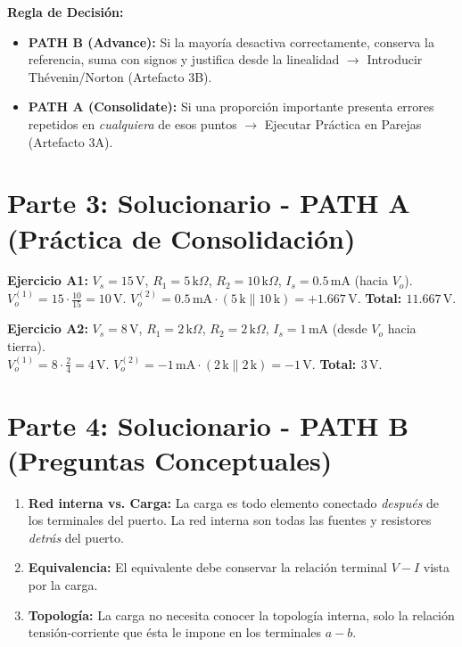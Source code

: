 \documentclass[11pt, a4paper]{article}
\begin{document}
\begin{tcolorbox}[colback=white, colframe=black, boxrule=0.5pt, arc=1mm]
\textbf{Regla de Decisión:}
\begin{itemize}
    \item \textbf{PATH B (Advance):} Si la mayoría desactiva correctamente, conserva la referencia, suma con signos y justifica desde la linealidad $\rightarrow$ Introducir Thévenin/Norton (Artefacto 3B).
    \item \textbf{PATH A (Consolidate):} Si una proporción importante presenta errores repetidos en \textit{cualquiera} de esos puntos $\rightarrow$ Ejecutar Práctica en Parejas (Artefacto 3A).
\end{itemize}
\end{tcolorbox}

\section*{Parte 3: Solucionario - PATH A (Práctica de Consolidación)}
\textbf{Ejercicio A1:} $V_s = 15\,\text{V}$, $R_1 = 5\,\text{k}\Omega$, $R_2 = 10\,\text{k}\Omega$, $I_s = 0.5\,\text{mA}$ (hacia $V_o$). \\
$V_o^{(1)} = 15 \cdot \frac{10}{15} = 10\,\text{V}$. \quad $V_o^{(2)} = 0.5\,\text{mA} \cdot (5\,\text{k} \parallel 10\,\text{k}) = +1.667\,\text{V}$. \quad \textbf{Total: $11.667\,\text{V}$}.

\vspace{0.2cm}
\noindent\textbf{Ejercicio A2:} $V_s = 8\,\text{V}$, $R_1 = 2\,\text{k}\Omega$, $R_2 = 2\,\text{k}\Omega$, $I_s = 1\,\text{mA}$ (desde $V_o$ hacia tierra). \\
$V_o^{(1)} = 8 \cdot \frac{2}{4} = 4\,\text{V}$. \quad $V_o^{(2)} = -1\,\text{mA} \cdot (2\,\text{k} \parallel 2\,\text{k}) = -1\,\text{V}$. \quad \textbf{Total: $3\,\text{V}$}.

\section*{Parte 4: Solucionario - PATH B (Preguntas Conceptuales)}
\begin{enumerate}
    \item \textbf{Red interna vs. Carga:} La carga es todo elemento conectado \textit{después} de los terminales del puerto. La red interna son todas las fuentes y resistores \textit{detrás} del puerto.
    \item \textbf{Equivalencia:} El equivalente debe conservar la relación terminal $V-I$ vista por la carga.
    \item \textbf{Topología:} La carga no necesita conocer la topología interna, solo la relación tensión-corriente que ésta le impone en los terminales $a-b$.
\end{enumerate}
\end{document}
